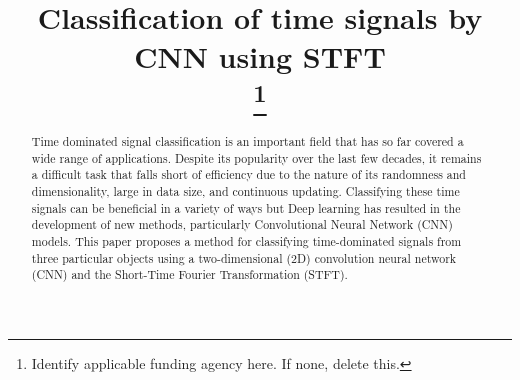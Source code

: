 \documentclass[conference]{IEEEtran}
\begin{document}
\title{Classification of time signals by CNN using STFT\\
\thanks{Identify applicable funding agency here. If none, delete this.}
}

\author{
\and
{}
\and
{}
\and
{}
}

\maketitle

\begin{abstract}
Time dominated signal classification is an important field  that has so far covered a wide range of applications. Despite its popularity over the last few decades, it remains a difficult task that falls short of efficiency due to the nature of its  randomness and dimensionality, large in data size, and continuous updating. Classifying these time signals can be beneficial in a variety of ways but Deep learning has resulted in the development of new methods, particularly Convolutional Neural Network (CNN) models. This paper proposes a method for classifying time-dominated signals from three particular objects using a two-dimensional (2D) convolution neural network (CNN) and the Short-Time Fourier Transformation (STFT).
\end{abstract}
\end{document}
